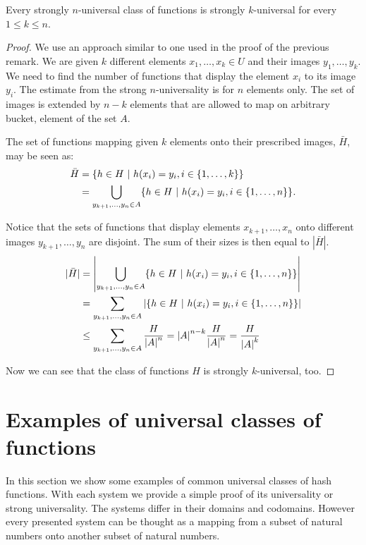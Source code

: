 \begin{remark}
Every strongly $n$-universal class of functions is strongly $k$-universal for every $1 \leq k \leq n$.
\end{remark}
\begin{proof}
We use an approach similar to one used in the proof of the previous remark. We are given $k$ different elements $x_1, \dots, x_k \in U$ and their images $y_1, \dots, y_k$. We need to find the number of functions that display the element $x_i$ to its image $y_i$. The estimate from the strong $n$-universality is for $n$ elements only. The set of images is extended by $n - k$ elements that are allowed to map on arbitrary bucket, element of the set $A$.

The set of functions mapping given $k$ elements onto their prescribed images, $\bar H$,  may be seen as:
\[
\begin{split}
\bar{H}	& = \lbrace h \in H \ | \  h(x_i) = y_i, i \in \lbrace 1, \dots, k \rbrace \rbrace \\
	& = \displaystyle \bigcup_{y_{k+1}, \dots, y_n \in A} \lbrace h \in H \ | \  h(x_i) = y_i, i \in \lbrace 1, \dots, n \rbrace \rbrace \textit{.}
\end{split}
\]

Notice that the sets of functions that display elements $x_{k + 1}, \dots, x_n$ onto different images $y_{k + 1}, \dots, y_n$ are disjoint. The sum of their sizes is then equal to $|\bar H|$.
\[
\begin{split}
|\bar H|& = \left| \displaystyle \bigcup_{y_{k+1}, \dots, y_n \in A} \lbrace h \in H \ | \  h(x_i) = y_i, i \in \lbrace 1, \dots, n \rbrace \rbrace \right| \\
	& = \displaystyle \sum_{y_{k+1}, \dots, y_n \in A} \left| \lbrace h \in H \ | \  h(x_i) = y_i, i \in \lbrace 1, \dots, n \rbrace \rbrace \right| \\
	& \leq \displaystyle \sum_{y_{k+1}, \dots, y_n \in A} \frac{H}{{|A|}^{n}} = {|A|}^{n - k} \frac{H}{{|A|}^{n}} = \frac{H}{{|A|}^{k}}
\end{split}
\]

Now we can see that the class of functions $H$ is strongly $k$-universal, too.
\end{proof}

\section{Examples of universal classes of functions}
In this section we show some examples of common universal classes of hash functions. With each system we provide a simple proof of its universality or strong universality. The systems differ in their domains and codomains. However every presented system can be thought as a mapping from a subset of natural numbers onto another subset of natural numbers.

